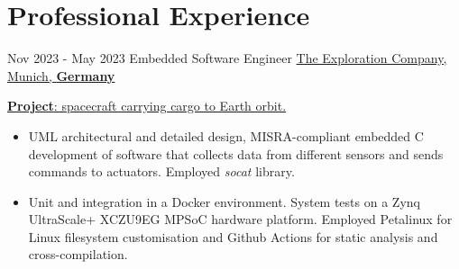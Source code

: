 \documentclass[letterpaper]{twentysecondcv} %
\begin{document}
\makeprofile %

%
%
\section{Professional Experience}

\begin{twenty} %

    \twentyitem
        {Nov 2023 -}
        {May 2023}
        {Embedded Software Engineer}
        {\href{https://www.exploration.space/}{The Exploration Company, Munich, \textbf{Germany}}}
        {}
        {
            \vspace{2 mm}
            \underline{\textbf{Project}: spacecraft carrying cargo to Earth orbit.}

            \vspace{2 mm}
            \begin{itemize}
                \item UML architectural and detailed design,  MISRA-compliant embedded C development of software that collects data from different sensors and sends commands to actuators. Employed \textit{socat} library.
                \item Unit and integration in a Docker environment.  System tests on a Zynq UltraScale+ XCZU9EG MPSoC hardware platform. Employed Petalinux for Linux filesystem customisation and Github Actions for static analysis and cross-compilation.
            \end{itemize}

}
\end{twenty}
\end{document}
